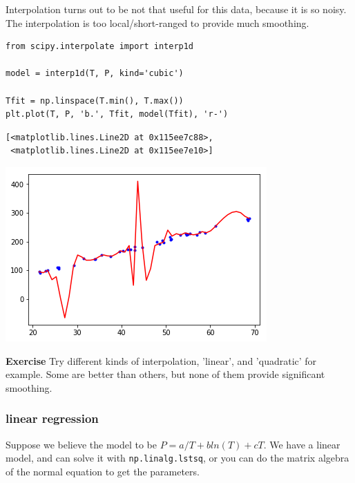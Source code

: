 \documentclass[11pt]{article}
\begin{document}
Interpolation turns out to be not that useful for this data, because it is so noisy. The interpolation is too local/short-ranged to provide much smoothing.

\begin{verbatim}
from scipy.interpolate import interp1d

model = interp1d(T, P, kind='cubic')

Tfit = np.linspace(T.min(), T.max())
plt.plot(T, P, 'b.', Tfit, model(Tfit), 'r-')
\end{verbatim}

\begin{verbatim}
[<matplotlib.lines.Line2D at 0x115ee7c88>,
 <matplotlib.lines.Line2D at 0x115ee7e10>]
\end{verbatim}



\begin{center}
\includegraphics[width=.9\linewidth]{obipy-resources/a10feaf5270288b4c795ebce6b64fde6-70304GXD.png}
\end{center}

\textbf{Exercise} Try different kinds of interpolation, 'linear', and 'quadratic' for example. Some are better than others, but none of them provide significant smoothing.


\subsubsection{linear regression}
\label{sec:org08ed7c6}

Suppose we believe the model to be \(P = a / T + b ln(T) + c T\). We have a linear model, and can solve it with \texttt{np.linalg.lstsq}, or you can do the matrix algebra of the normal equation to get the parameters.
\end{document}
